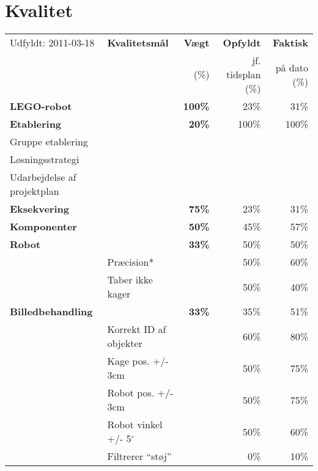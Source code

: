 \section{Kvalitet}
\begin{footnotesize}
\begin{center}
\begin{tabular}{l | l | r r r}
	\footnotesize{Udfyldt: 2011-03-18}	& \textbf{Kvalitetsmål} & \textbf{Vægt} & \textbf{Opfyldt} & \textbf{Faktisk}\\
	& & \footnotesize{(\%)}	& \footnotesize{jf. tidsplan (\%)}	& \footnotesize{på dato (\%)} \\
	\hline
	\textbf{LEGO-robot}
																&		& \textbf{100\%} & 23\% & 31\% \\
	\hline
	\hline
	\textbf{Etablering}
																&		& \textbf{20\%} 	& 	100\%	& 100\% \\
	\hspace*{0.3cm} Gruppe etablering
					 											&		&		&		& \\
	\hspace*{0.3cm} Løsningsstrategi
					 											&		&		&		& \\
	\hspace*{0.3cm} Udarbejdelse af projektplan 
																&		&		&		& \\
	\hline
	\textbf{Eksekvering}
																&		& \textbf{75\%}	& 23\% & 31\% \\		
	\hspace*{0.3cm}\textbf{Komponenter}
																&		& \textbf{50\%}		& 	45\% & 57\%\\
	\hspace*{0.3cm}\hspace*{0.3cm} \textbf{Robot}
																& 		& \textbf{33\%} 	& 	50\% & 50\% \\
	& Præcision* & & 50\% & 60\% \\
	& Taber ikke kager & & 50\% & 40\% \\
	\hspace*{0.3cm}\hspace*{0.3cm} \textbf{Billedbehandling}
																& & \textbf{33\%}		&	35\% & 	51\% \\
	& Korrekt ID af objekter & & 60\% & 80\% \\
	& Kage pos. +/- 3cm & & 50\% & 75\% \\
	& Robot pos. +/- 3cm & & 50\% & 75\% \\
	& Robot vinkel +/- 5$^\circ$ & & 50\% & 60\% \\
	& Filtrerer "`støj"' & & 0\% & 10\% \\

\end{tabular}
\end{center}
\end{footnotesize}
